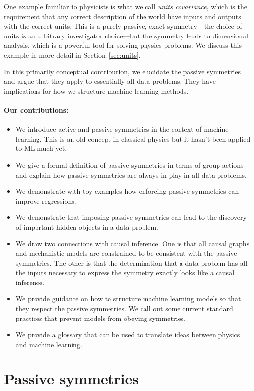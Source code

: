 \documentclass{article}
\theoremstyle{plain}
\theoremstyle{definition}
\theoremstyle{remark}
\newcommand{\sectionname}{Section}
\newcommand{\secref}[1]{\sectionname~\ref{#1}}
\begin{document}
One example familiar to physicists is what we call \emph{units covariance}, which is the requirement that any correct description of the world have inputs and outputs with the correct units.
This is a purely passive, exact symmetry---the choice of units is an arbitrary investigator choice---but the symmetry leads to dimensional analysis, which is a powerful tool for solving physics problems.
We discuss this example in more detail in \secref{sec:units}.

In this primarily conceptual contribution, we elucidate the passive symmetries and argue that they apply to essentially all data problems.
They have implications for how we structure machine-learning methods.

\paragraph{Our contributions:}
\begin{itemize}
\item
We introduce active and passive symmetries in the context of machine learning. This is an old concept in classical physics but it hasn't been applied to ML much yet.
\item
We give a formal definition of passive symmetries in terms of group actions and explain how passive symmetries are always in play in all data problems.
\item
We demonstrate with toy examples how enforcing passive symmetries can improve regressions. 
\item
We demonstrate that imposing passive symmetries can lead to the discovery of important hidden objects in a data problem.
\item
We draw two connections with causal inference. One is that all causal graphs and mechanistic models are constrained to be consistent with the passive symmetries. The other is that the determination that a data problem has all the inputs necessary to express the symmetry exactly looks like a causal inference.
\item 
We provide guidance on how to structure machine learning models so that they respect the passive symmetries. We call out some current standard practices that prevent models from obeying symmetries. 
\item
We provide a glossary that can be used to translate ideas between physics and machine learning. 
\end{itemize}

\section{Passive symmetries}\label{sec:informal}
\end{document}
